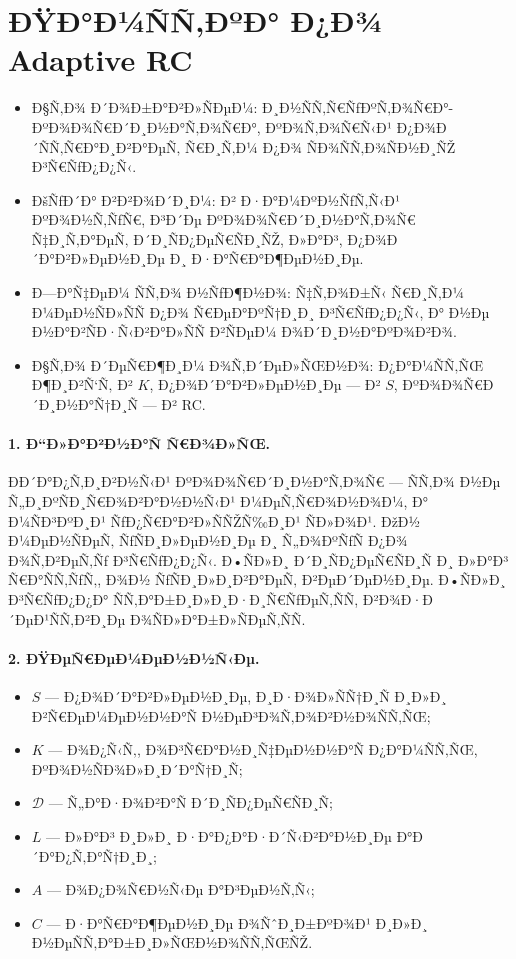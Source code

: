 \section*{ÐŸÐ°Ð¼ÑÑ‚ÐºÐ° Ð¿Ð¾ Adaptive RC}

\begin{itemize}
    \item Ð§Ñ‚Ð¾ Ð´Ð¾Ð±Ð°Ð²Ð»ÑÐµÐ¼: Ð¸Ð½ÑÑ‚Ñ€ÑƒÐºÑ‚Ð¾Ñ€Ð°-ÐºÐ¾Ð¾Ñ€Ð´Ð¸Ð½Ð°Ñ‚Ð¾Ñ€Ð°, ÐºÐ¾Ñ‚Ð¾Ñ€Ñ‹Ð¹ Ð¿Ð¾Ð´ÑÑ‚Ñ€Ð°Ð¸Ð²Ð°ÐµÑ‚ Ñ€Ð¸Ñ‚Ð¼ Ð¿Ð¾ ÑÐ¾ÑÑ‚Ð¾ÑÐ½Ð¸ÑŽ Ð³Ñ€ÑƒÐ¿Ð¿Ñ‹.
    \item ÐšÑƒÐ´Ð° Ð²Ð²Ð¾Ð´Ð¸Ð¼: Ð² Ð·Ð°Ð¼ÐºÐ½ÑƒÑ‚Ñ‹Ð¹ ÐºÐ¾Ð½Ñ‚ÑƒÑ€, Ð³Ð´Ðµ ÐºÐ¾Ð¾Ñ€Ð´Ð¸Ð½Ð°Ñ‚Ð¾Ñ€ Ñ‡Ð¸Ñ‚Ð°ÐµÑ‚ Ð´Ð¸ÑÐ¿ÐµÑ€ÑÐ¸ÑŽ, Ð»Ð°Ð³, Ð¿Ð¾Ð´Ð°Ð²Ð»ÐµÐ½Ð¸Ðµ Ð¸ Ð·Ð°Ñ€Ð°Ð¶ÐµÐ½Ð¸Ðµ.
    \item Ð—Ð°Ñ‡ÐµÐ¼ ÑÑ‚Ð¾ Ð½ÑƒÐ¶Ð½Ð¾: Ñ‡Ñ‚Ð¾Ð±Ñ‹ Ñ€Ð¸Ñ‚Ð¼ Ð¼ÐµÐ½ÑÐ»ÑÑ Ð¿Ð¾ Ñ€ÐµÐ°ÐºÑ†Ð¸Ð¸ Ð³Ñ€ÑƒÐ¿Ð¿Ñ‹, Ð° Ð½Ðµ Ð½Ð°Ð²ÑÐ·Ñ‹Ð²Ð°Ð»ÑÑ Ð²ÑÐµÐ¼ Ð¾Ð´Ð¸Ð½Ð°ÐºÐ¾Ð²Ð¾.
    \item Ð§Ñ‚Ð¾ Ð´ÐµÑ€Ð¶Ð¸Ð¼ Ð¾Ñ‚Ð´ÐµÐ»ÑŒÐ½Ð¾: Ð¿Ð°Ð¼ÑÑ‚ÑŒ Ð¶Ð¸Ð²Ñ‘Ñ‚ Ð² $K$, Ð¿Ð¾Ð´Ð°Ð²Ð»ÐµÐ½Ð¸Ðµ --- Ð² $S$, ÐºÐ¾Ð¾Ñ€Ð´Ð¸Ð½Ð°Ñ†Ð¸Ñ --- Ð² RC.
\end{itemize}

\paragraph{1. Ð“Ð»Ð°Ð²Ð½Ð°Ñ Ñ€Ð¾Ð»ÑŒ.}
ÐÐ´Ð°Ð¿Ñ‚Ð¸Ð²Ð½Ñ‹Ð¹ ÐºÐ¾Ð¾Ñ€Ð´Ð¸Ð½Ð°Ñ‚Ð¾Ñ€ --- ÑÑ‚Ð¾ Ð½Ðµ Ñ„Ð¸ÐºÑÐ¸Ñ€Ð¾Ð²Ð°Ð½Ð½Ñ‹Ð¹ Ð¼ÐµÑ‚Ñ€Ð¾Ð½Ð¾Ð¼, Ð° Ð¼ÑÐ³ÐºÐ¸Ð¹ ÑƒÐ¿Ñ€Ð°Ð²Ð»ÑÑŽÑ‰Ð¸Ð¹ ÑÐ»Ð¾Ð¹. ÐžÐ½ Ð¼ÐµÐ½ÑÐµÑ‚ ÑƒÑÐ¸Ð»ÐµÐ½Ð¸Ðµ Ð¸ Ñ„Ð¾ÐºÑƒÑ Ð¿Ð¾ Ð¾Ñ‚Ð²ÐµÑ‚Ñƒ Ð³Ñ€ÑƒÐ¿Ð¿Ñ‹. Ð•ÑÐ»Ð¸ Ð´Ð¸ÑÐ¿ÐµÑ€ÑÐ¸Ñ Ð¸ Ð»Ð°Ð³ Ñ€Ð°ÑÑ‚ÑƒÑ‚, Ð¾Ð½ ÑƒÑÐ¸Ð»Ð¸Ð²Ð°ÐµÑ‚ Ð²ÐµÐ´ÐµÐ½Ð¸Ðµ. Ð•ÑÐ»Ð¸ Ð³Ñ€ÑƒÐ¿Ð¿Ð° ÑÑ‚Ð°Ð±Ð¸Ð»Ð¸Ð·Ð¸Ñ€ÑƒÐµÑ‚ÑÑ, Ð²Ð¾Ð·Ð´ÐµÐ¹ÑÑ‚Ð²Ð¸Ðµ Ð¾ÑÐ»Ð°Ð±Ð»ÑÐµÑ‚ÑÑ.

\paragraph{2. ÐŸÐµÑ€ÐµÐ¼ÐµÐ½Ð½Ñ‹Ðµ.}
\begin{itemize}
    \item $S$ --- Ð¿Ð¾Ð´Ð°Ð²Ð»ÐµÐ½Ð¸Ðµ, Ð¸Ð·Ð¾Ð»ÑÑ†Ð¸Ñ Ð¸Ð»Ð¸ Ð²Ñ€ÐµÐ¼ÐµÐ½Ð½Ð°Ñ Ð½ÐµÐ³Ð¾Ñ‚Ð¾Ð²Ð½Ð¾ÑÑ‚ÑŒ;
    \item $K$ --- Ð¾Ð¿Ñ‹Ñ‚, Ð¾Ð³Ñ€Ð°Ð½Ð¸Ñ‡ÐµÐ½Ð½Ð°Ñ Ð¿Ð°Ð¼ÑÑ‚ÑŒ, ÐºÐ¾Ð½ÑÐ¾Ð»Ð¸Ð´Ð°Ñ†Ð¸Ñ;
    \item $\mathcal{D}$ --- Ñ„Ð°Ð·Ð¾Ð²Ð°Ñ Ð´Ð¸ÑÐ¿ÐµÑ€ÑÐ¸Ñ;
    \item $L$ --- Ð»Ð°Ð³ Ð¸Ð»Ð¸ Ð·Ð°Ð¿Ð°Ð·Ð´Ñ‹Ð²Ð°Ð½Ð¸Ðµ Ð°Ð´Ð°Ð¿Ñ‚Ð°Ñ†Ð¸Ð¸;
    \item $A$ --- Ð¾Ð¿Ð¾Ñ€Ð½Ñ‹Ðµ Ð°Ð³ÐµÐ½Ñ‚Ñ‹;
    \item $C$ --- Ð·Ð°Ñ€Ð°Ð¶ÐµÐ½Ð¸Ðµ Ð¾ÑˆÐ¸Ð±ÐºÐ¾Ð¹ Ð¸Ð»Ð¸ Ð½ÐµÑÑ‚Ð°Ð±Ð¸Ð»ÑŒÐ½Ð¾ÑÑ‚ÑŒÑŽ.
\end{itemize}

